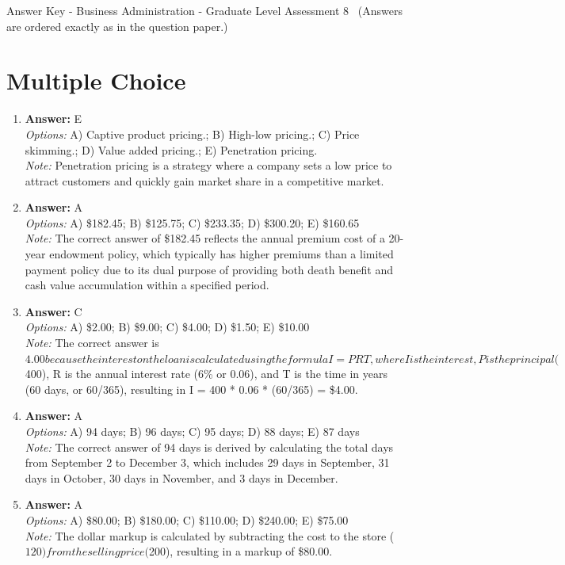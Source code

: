 \documentclass[12pt]{article}
\begin{document}
\begin{center}
Answer Key - Business Administration - Graduate Level Assessment 8 \
\small (Answers are ordered exactly as in the question paper.)
\end{center}

\section*{Multiple Choice}
\begin{enumerate}[label=\arabic*.]
\item \textbf{Answer:} E
\\ \textit{Options:} A) Captive product pricing.; B) High-low pricing.; C) Price skimming.; D) Value added pricing.; E) Penetration pricing.
\\ \textit{Note:} Penetration pricing is a strategy where a company sets a low price to attract customers and quickly gain market share in a competitive market.
\item \textbf{Answer:} A
\\ \textit{Options:} A) \$182.45; B) \$125.75; C) \$233.35; D) \$300.20; E) \$160.65
\\ \textit{Note:} The correct answer of \$182.45 reflects the annual premium cost of a 20-year endowment policy, which typically has higher premiums than a limited payment policy due to its dual purpose of providing both death benefit and cash value accumulation within a specified period.
\item \textbf{Answer:} C
\\ \textit{Options:} A) \$2.00; B) \$9.00; C) \$4.00; D) \$1.50; E) \$10.00
\\ \textit{Note:} The correct answer is $4.00 because the interest on the loan is calculated using the formula I = PRT, where I is the interest, P is the principal ($400), R is the annual interest rate (6\% or 0.06), and T is the time in years (60 days, or 60/365), resulting in I = 400 * 0.06 * (60/365) = \$4.00.
\item \textbf{Answer:} A
\\ \textit{Options:} A) 94 days; B) 96 days; C) 95 days; D) 88 days; E) 87 days
\\ \textit{Note:} The correct answer of 94 days is derived by calculating the total days from September 2 to December 3, which includes 29 days in September, 31 days in October, 30 days in November, and 3 days in December.
\item \textbf{Answer:} A
\\ \textit{Options:} A) \$80.00; B) \$180.00; C) \$110.00; D) \$240.00; E) \$75.00
\\ \textit{Note:} The dollar markup is calculated by subtracting the cost to the store ($120) from the selling price ($200), resulting in a markup of \$80.00.
\end{enumerate}
\end{document}
